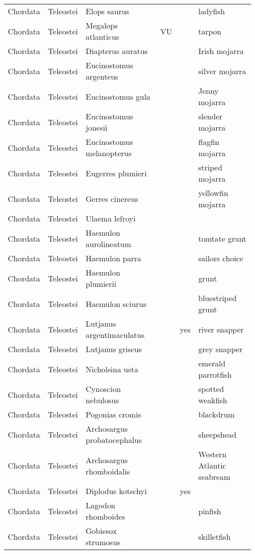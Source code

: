 \begin{longtable}{llllll}
  Chordata & Teleostei & Elops saurus &  &  & ladyfish \\ 
  Chordata & Teleostei & Megalops atlanticus & VU &  & tarpon \\ 
  Chordata & Teleostei & Diapterus auratus &  &  & Irish mojarra \\ 
  Chordata & Teleostei & Eucinostomus argenteus &  &  & silver mojarra \\ 
  Chordata & Teleostei & Eucinostomus gula &  &  & Jenny mojarra \\ 
  Chordata & Teleostei & Eucinostomus jonesii &  &  & slender mojarra \\ 
  Chordata & Teleostei & Eucinostomus melanopterus &  &  & flagfin mojarra \\ 
  Chordata & Teleostei & Eugerres plumieri &  &  & striped mojarra \\ 
  Chordata & Teleostei & Gerres cinereus &  &  & yellowfin mojarra \\ 
  Chordata & Teleostei & Ulaema lefroyi &  &  &  \\ 
  Chordata & Teleostei & Haemulon aurolineatum &  &  & tomtate grunt \\ 
  Chordata & Teleostei & Haemulon parra &  &  & sailors choice \\ 
  Chordata & Teleostei & Haemulon plumierii &  &  & grunt \\ 
  Chordata & Teleostei & Haemulon sciurus &  &  & bluestriped grunt \\ 
  Chordata & Teleostei & Lutjanus argentimaculatus &  & yes & river snapper \\ 
  Chordata & Teleostei & Lutjanus griseus &  &  & grey snapper \\ 
  Chordata & Teleostei & Nicholsina usta &  &  & emerald parrotfish \\ 
  Chordata & Teleostei & Cynoscion nebulosus &  &  & spotted weakfish \\ 
  Chordata & Teleostei & Pogonias cromis &  &  & blackdrum \\ 
  Chordata & Teleostei & Archosargus probatocephalus &  &  & sheepshead \\ 
  Chordata & Teleostei & Archosargus rhomboidalis &  &  & Western Atlantic seabream \\ 
  Chordata & Teleostei & Diplodus kotschyi &  & yes &  \\ 
  Chordata & Teleostei & Lagodon rhomboides &  &  & pinfish \\ 
  Chordata & Teleostei & Gobiesox strumosus &  &  & skilletfish \\ 

\end{longtable}
